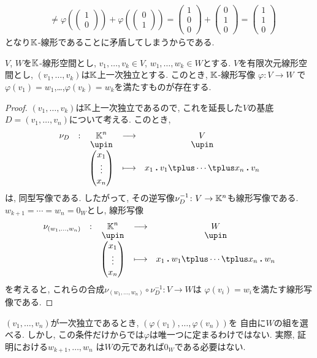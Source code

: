 \begin{remark}
\begin{align*}
  \\
  &\neq \varphi(\begin{pmatrix}1\\0\end{pmatrix})+\varphi(\begin{pmatrix}0\\1\end{pmatrix})=
\begin{pmatrix}1\\0\\0\end{pmatrix}+\begin{pmatrix}0\\1\\0\end{pmatrix}
  =\begin{pmatrix}1\\1\\0\end{pmatrix}
  \end{align*}
  となり$\mathbb{K}$-線形であることに矛盾してしまうからである.
\end{remark}

\begin{prop}
  $V$, $W$を$\mathbb{K}$-線形空間とし,
  $v_1,\ldots,v_k\in V$,
  $w_1,\ldots,w_k\in W$とする.
  $V$を有限次元線形空間とし,
  $(v_1,\ldots,v_k)$は$\mathbb{K}$上一次独立とする.
  このとき,
  $\mathbb{K}$-線形写像
  $\varphi\colon V\to W$
  で$\varphi(v_1)=w_1$,\ldots,$\varphi(v_k)=w_k$を満たすものが存在する.
\end{prop}
\begin{proof}
  $(v_1,\ldots,v_k)$は$\mathbb{K}$上一次独立であるので,
  これを延長した$V$の基底$D=(v_1,\ldots,v_n)$について考える.
  このとき,
  \begin{align*}
    \shazo{\nu_{D}}{\KK^n}{V}
          {\begin{pmatrix}x_1\\\vdots\\x_n\end{pmatrix}}
          {x_1\act v_1\plus \cdots\plus x_n\act v_n}
 \end{align*}
 は, 同型写像である.
 したがって,
 その逆写像$\nu_{D}^{-1}\colon V\to \mathbb{K}^n$も線形写像である.
 $w_{k+1}=\cdots=w_{n}=0_W$とし,
 線形写像
  \begin{align*}
    \shazo{\nu_{(w_1,\ldots,w_n)}}{\KK^n}{W}
          {\begin{pmatrix}x_1\\\vdots\\x_n\end{pmatrix}}
          {x_1\act w_1\plus \cdots\plus x_n\act w_n}
 \end{align*}
 を考えると,
 これらの合成$\nu_{(w_1,\ldots,w_n)}\circ\nu_{D}^{-1}\colon V\to W$は
 $\varphi(v_i)=w_i$を満たす線形写像である.
\end{proof}
\begin{remark}
  $(v_1,\ldots,v_n)$が一次独立であるとき,
  $(\varphi(v_1),\ldots,\varphi(v_n))$を
  自由に$W$の組を選べる.
  しかし,
この条件だけからでは$\varphi$は唯一つに定まるわけではない.
実際,
  証明における$w_{k+1},\ldots, w_{n}$
  は$W$の元であれば$0_W$である必要はない.
\end{remark}

